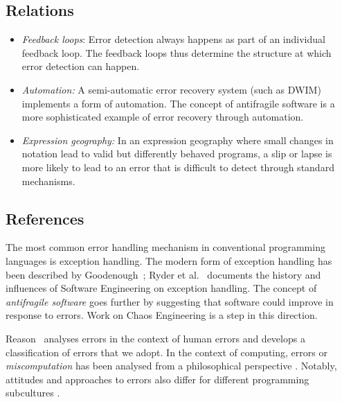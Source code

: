 \documentclass[ twoside,openright,titlepage,numbers=noenddot,headinclude,footinclude,cleardoublepage=empty,abstract=on,
                BCOR=5mm,paper=a4,fontsize=11pt
                ]{scrreprt}
\newcommand{\note}[1]{}
\providecommand{\tightlist}{}\newenvironment{longtable}[2]{\begin{tabular}}{\end{tabular}}
\theoremstyle{definition}
\begin{document}
\hypertarget{relations-4}{\subsection{Relations}\label{relations-4}}

\begin{itemize}
\tightlist
\item
  \emph{Feedback loops}: Error detection always happens as part of an
  individual feedback loop. The feedback loops thus determine the
  structure at which error detection can happen.
  \note{- _Information loss_: Certain mechanism for error detection can only work if sufficient amount of information is available. For example, traveling debugger facility requires at least a form of execution log (but could also be easily implemented in a system based on bi-directional evaluation).}
\item
  \emph{Automation:} A semi-automatic error recovery system (such as
  DWIM) implements a form of automation. The concept of antifragile
  software \parencite{Antifragile} is a more sophisticated example of
  error recovery through automation.
\item
  \emph{Expression geography:} In an expression geography where small
  changes in notation lead to valid but differently behaved programs, a
  slip or lapse is more likely to lead to an error that is difficult to
  detect through standard mechanisms.
\end{itemize}

\hypertarget{references-3}{\subsection{References}\label{references-3}}

The most common error handling mechanism in conventional programming
languages is exception handling. The modern form of exception handling
has been described by Goodenough~\parencite{ExceptionHandling}; Ryder et
al.~\parencite{SweImpact} documents the history and influences of
Software Engineering on exception handling. The concept of
\emph{antifragile software} \parencite{Antifragile} goes further by
suggesting that software could improve in response to errors. Work on
Chaos Engineering \parencite{ChaosMonkey} is a step in this direction.

Reason~\parencite{HumanError} analyses errors in the context of human
errors and develops a classification of errors that we adopt. In the
context of computing, errors or \emph{miscomputation} has been analysed
from a philosophical perspective
\parencite{Miscomputation,MalfunctioningSW}. Notably, attitudes and
approaches to errors also differ for different programming subcultures
\parencite{LivingWithErrors}.
\end{document}
